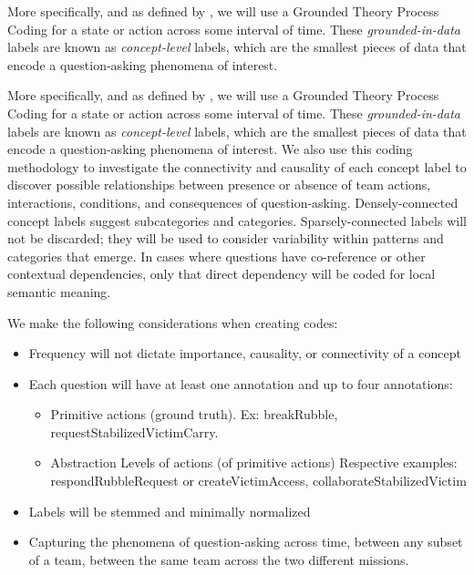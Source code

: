 More specifically, and as defined by \citep{saldana_2021}, we will use a
Grounded Theory Process Coding for a state or action across some interval of
time. These \emph{grounded-in-data} labels are known as \emph{concept-level}
labels, which are the smallest pieces of data that encode a question-asking
phenomena of interest.

More specifically, and as defined by \citep{saldana_2021}, we will use a
Grounded Theory Process Coding for a state or action across some interval of
time. These \emph{grounded-in-data} labels are known as \emph{concept-level}
labels, which are the smallest pieces of data that encode a question-asking
phenomena of interest. We also use this coding methodology to investigate the connectivity and
causality of each concept label to discover possible relationships between
presence or absence of team actions, interactions, conditions, and consequences
of question-asking. Densely-connected concept labels suggest subcategories and
categories. Sparsely-connected labels will not be discarded; they will be used
to consider variability within patterns and categories that emerge. In cases
where questions have co-reference or other contextual dependencies, only that
direct dependency will be coded for local semantic meaning.

We make the following considerations when creating codes: 

\begin{itemize}
    \item Frequency will not dictate importance, causality, or connectivity of a concept
    \item Each question will have at least one annotation and up to four
      annotations:
    \begin{itemize}
        \item Primitive actions (ground truth). Ex: breakRubble,
          requestStabilizedVictimCarry.
        \item Abstraction Levels of actions (of primitive actions) Respective
          examples: respondRubbleRequest or createVictimAccess, collaborateStabilizedVictim
    \end{itemize}
    \item Labels will be stemmed and minimally normalized
    \item Capturing the phenomena of question-asking across time, between any subset of a team, between the same team across the two different missions. 
\end{itemize}


